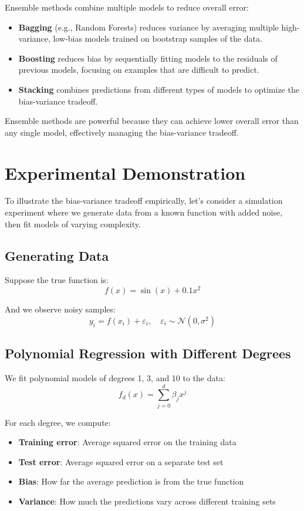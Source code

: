 \documentclass{article}
\begin{document}
Ensemble methods combine multiple models to reduce overall error:

\begin{itemize}
\item \textbf{Bagging} (e.g., Random Forests) reduces variance by averaging multiple high-variance, low-bias models trained on bootstrap samples of the data.
\item \textbf{Boosting} reduces bias by sequentially fitting models to the residuals of previous models, focusing on examples that are difficult to predict.
\item \textbf{Stacking} combines predictions from different types of models to optimize the bias-variance tradeoff.
\end{itemize}

Ensemble methods are powerful because they can achieve lower overall error than any single model, effectively managing the bias-variance tradeoff.

\section{Experimental Demonstration}

To illustrate the bias-variance tradeoff empirically, let's consider a simulation experiment where we generate data from a known function with added noise, then fit models of varying complexity.

\subsection{Generating Data}

Suppose the true function is:
\[
f(x) = \sin(x) + 0.1x^2
\]

And we observe noisy samples:
\[
y_i = f(x_i) + \varepsilon_i, \quad \varepsilon_i \sim \mathcal{N}(0, \sigma^2)
\]

\subsection{Polynomial Regression with Different Degrees}

We fit polynomial models of degrees 1, 3, and 10 to the data:
\[
f_d(x) = \sum_{j=0}^{d} \beta_j x^j
\]

For each degree, we compute:
\begin{itemize}
\item \textbf{Training error}: Average squared error on the training data
\item \textbf{Test error}: Average squared error on a separate test set
\item \textbf{Bias}: How far the average prediction is from the true function
\item \textbf{Variance}: How much the predictions vary across different training sets
\end{itemize}
\end{document}

